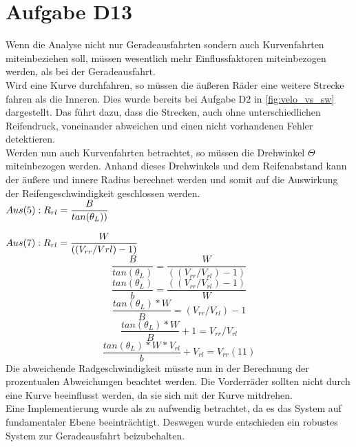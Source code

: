 \chapter{Aufgabe D13}

Wenn die Analyse nicht nur Geradeausfahrten sondern auch Kurvenfahrten miteinbeziehen soll, müssen wesentlich mehr Einflussfaktoren miteinbezogen werden, als bei der Geradeausfahrt.\\
Wird eine Kurve durchfahren, so müssen die äußeren Räder eine weitere Strecke fahren als die Inneren. Dies wurde bereits bei Aufgabe D2 in \autoref{fig:velo_vs_sw} dargestellt. Das führt dazu, dass die Strecken, auch ohne unterschiedlichen Reifendruck, voneinander abweichen und einen nicht vorhandenen Fehler detektieren.\\
Werden nun auch Kurvenfahrten betrachtet, so müssen die Drehwinkel $\Theta$ miteinbezogen werden. Anhand dieses Drehwinkels und dem Reifenabstand kann der äußere und innere Radius berechnet werden und somit auf die Auswirkung der Reifengeschwindigkeit geschlossen werden. \\


$
Aus (5): R_{rl} = \dfrac{B}{tan(\theta_{L}))}\\
$

$
Aus (7): R_{rl} =  \dfrac{W}{((V_{rr}/V{rl}) -1)}\\
$
$$
\dfrac{B}{tan(\theta_{L})} = \dfrac{W}{((V_{rr}/V_{rl} )-1)}
$$
$$
 \dfrac{tan(\theta_{L})}{b} = \dfrac{((V_{rr}/V_{rl}) -1)}{W}
 $$
 $$
  \dfrac{tan(\theta_{L})*W}{B} = (V_{rr}/V_{rl})-1
$$
$$
 \dfrac{ tan(\theta_{L})*W}{B}+1 = V_{rr}/V_{rl}
 $$
 $$ 
 \dfrac{ tan(\theta_{L})*W*V_{rl}}{b}+V_{rl} = V_{rr}  ( 11 )
 $$
 Die abweichende Radgeschwindigkeit müsste nun in der Berechnung der prozentualen Abweichungen beachtet werden.
 Die Vorderräder sollten nicht durch eine Kurve beeinflusst werden, da sie sich mit der Kurve mitdrehen.\\
 Eine Implementierung wurde als zu aufwendig betrachtet, da es das System auf fundamentaler Ebene beeinträchtigt. Deswegen wurde entschieden ein robustes System zur Geradeausfahrt beizubehalten.
 

